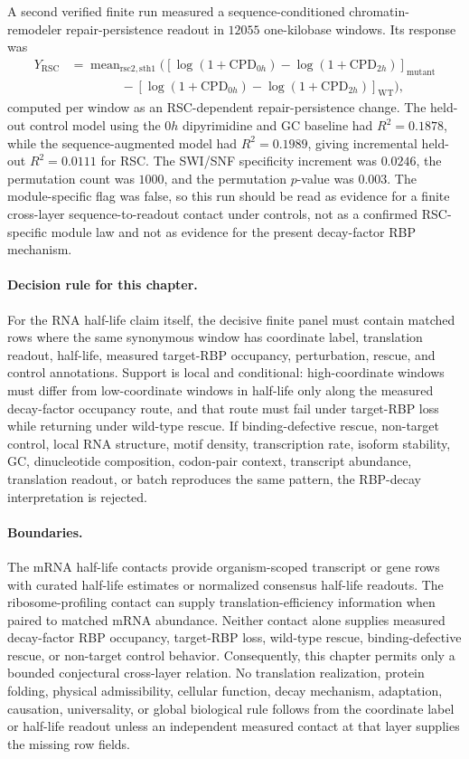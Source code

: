 A second verified finite run measured a sequence-conditioned chromatin-remodeler repair-persistence readout in $12055$ one-kilobase windows. Its response was
$$
\begin{aligned}
Y_{\mathrm{RSC}}
  &= \operatorname{mean}_{\mathrm{rsc2},\mathrm{sth1}}
     \bigl([\log(1+\mathrm{CPD}_{0h})-\log(1+\mathrm{CPD}_{2h})]_{\mathrm{mutant}}\\
  &\qquad\qquad - [\log(1+\mathrm{CPD}_{0h})-\log(1+\mathrm{CPD}_{2h})]_{\mathrm{WT}}\bigr),
\end{aligned}
$$
computed per window as an RSC-dependent repair-persistence change. The held-out control model using the $0h$ dipyrimidine and GC baseline had $R^2=0.1878$, while the sequence-augmented model had $R^2=0.1989$, giving incremental held-out $R^2=0.0111$ for RSC. The SWI/SNF specificity increment was $0.0246$, the permutation count was $1000$, and the permutation $p$-value was $0.003$. The module-specific flag was false, so this run should be read as evidence for a finite cross-layer sequence-to-readout contact under controls, not as a confirmed RSC-specific module law and not as evidence for the present decay-factor RBP mechanism.

\paragraph{Decision rule for this chapter.}
For the RNA half-life claim itself, the decisive finite panel must contain matched rows where the same synonymous window has coordinate label, translation readout, half-life, measured target-RBP occupancy, perturbation, rescue, and control annotations. Support is local and conditional: high-coordinate windows must differ from low-coordinate windows in half-life only along the measured decay-factor occupancy route, and that route must fail under target-RBP loss while returning under wild-type rescue. If binding-defective rescue, non-target control, local RNA structure, motif density, transcription rate, isoform stability, GC, dinucleotide composition, codon-pair context, transcript abundance, translation readout, or batch reproduces the same pattern, the RBP-decay interpretation is rejected.

\paragraph{Boundaries.}
The mRNA half-life contacts provide organism-scoped transcript or gene rows with curated half-life estimates or normalized consensus half-life readouts. The ribosome-profiling contact can supply translation-efficiency information when paired to matched mRNA abundance. Neither contact alone supplies measured decay-factor RBP occupancy, target-RBP loss, wild-type rescue, binding-defective rescue, or non-target control behavior. Consequently, this chapter permits only a bounded conjectural cross-layer relation. No translation realization, protein folding, physical admissibility, cellular function, decay mechanism, adaptation, causation, universality, or global biological rule follows from the coordinate label or half-life readout unless an independent measured contact at that layer supplies the missing row fields.
